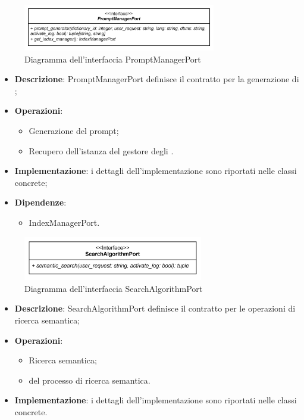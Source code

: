 \label{PromptManagerPort}
\begin{figure}[H]
    \centering
    \includegraphics[width=0.75\textwidth]{assets/Backend/prompt_manager_port.png}
    \caption{Diagramma dell'interfaccia PromptManagerPort}
  \end{figure}
\begin{itemize}
    \item \textbf{Descrizione}: PromptManagerPort definisce il contratto per la generazione di ;
    \item \textbf{Operazioni}:
    \begin{itemize}
      \item Generazione del prompt;
      \item Recupero dell'istanza del gestore degli .
    \end{itemize}
    \item \textbf{Implementazione}: i dettagli dell'implementazione sono riportati nelle classi concrete;
    \item \textbf{Dipendenze}:
    \begin{itemize}
        \item IndexManagerPort.
    \end{itemize}
\end{itemize} 

 \label{SearchAlgorithmPort}
\begin{figure}[H]
    \centering
    \includegraphics[width=0.7\textwidth]{assets/Backend/search_algorithm_port.png}
    \caption{Diagramma dell'interfaccia SearchAlgorithmPort}
  \end{figure}
\begin{itemize}
    \item \textbf{Descrizione}: SearchAlgorithmPort definisce il contratto per le operazioni di ricerca semantica;
    \item \textbf{Operazioni}:
    \begin{itemize}
      \item Ricerca semantica;
      \item {} del processo di ricerca semantica.
    \end{itemize}
    \item \textbf{Implementazione}: i dettagli dell'implementazione sono riportati nelle classi concrete.
\end{itemize}  

